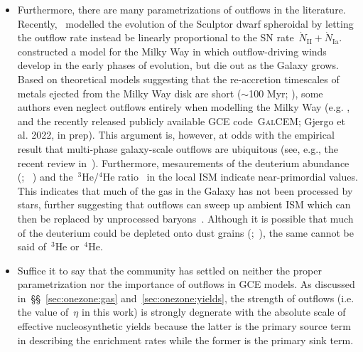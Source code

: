 \documentclass[ms.tex]{subfiles}
\begin{document}
\begin{itemize}
	\item Furthermore, there are many parametrizations of outflows in the
	literature. Recently,~\citet{delosReyes2022} modelled the evolution of the
	Sculptor dwarf spheroidal by letting the outflow rate instead be linearly
	proportional to the SN rate~$\dot{N}_\text{II} + \dot{N}_\text{Ia}$.
	\citet*{Kobayashi2020} constructed a model for the Milky Way in which
	outflow-driving winds develop in the early phases of evolution, but die
	out as the Galaxy grows.
	Based on theoretical models suggesting that the re-accretion timescales
	of metals ejected from the Milky Way disk are short ($\sim$100 Myr;
	\citealp{Melioli2008, Melioli2009, Spitoni2008, Spitoni2009}), some
	authors even neglect outflows entirely when modelling the Milky Way (e.g.
	\citealp{Spitoni2019, Spitoni2021}, and the recently released publicly
	available GCE code~\textsc{GalCEM}; Gjergo et al. 2022, in prep).
	This argument is, however, at odds with the empirical result that
	multi-phase galaxy-scale outflows are ubiquitous (see, e.g., the
	recent review in~\citealp{Veilleux2020}).
	Furthermore, mesaurements of the deuterium abundance (\citealp{Linsky2006};
	~\citealp*{Prodanovic2010}) and the~$^3$He/$^4$He ratio~\citep{Balser2018}
	in the local ISM indicate near-primordial values.
	This indicates that much of the gas in the Galaxy has not been
	processed by stars, further suggesting that outflows can sweep up ambient
	ISM which can then be replaced by unprocessed baryons~\citep{Weinberg2017b,
	Cooke2022}.
	Although it is possible that much of the deuterium could be depleted
	onto dust grains (\citealp{Romano2006};~\citealp*{Steigman2007}), the
	same cannot be said of~$^3$He or~$^4$He.

	\item Suffice it to say that the community has settled on neither the
	proper parametrization nor the importance of outflows in GCE models.
	As discussed in~\S\S~\ref{sec:onezone:gas} and~\ref{sec:onezone:yields},
	the strength of outflows (i.e. the value of~$\eta$ in this work) is
	strongly degnerate with the absolute scale of effective nucleosynthetic
	yields because the latter is the primary source term in describing the
	enrichment rates while the former is the primary sink term.


\end{itemize}
\end{document}
